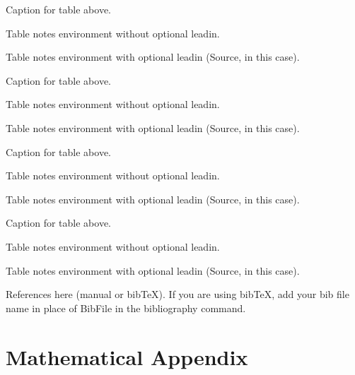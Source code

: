 \documentclass[AER]{AEA}
\begin{document}
\begin{table}
\caption{Caption for table above.}



\begin{tablenotes}
Table notes environment without optional leadin.
\end{tablenotes}
\begin{tablenotes}[Source]
Table notes environment with optional leadin (Source, in this case).
\end{tablenotes}
\end{table}

\begin{table}
\caption{Caption for table above.}



\begin{tablenotes}
Table notes environment without optional leadin.
\end{tablenotes}
\begin{tablenotes}[Source]
Table notes environment with optional leadin (Source, in this case).
\end{tablenotes}
\end{table}

\begin{table}
\caption{Caption for table above.}



\begin{tablenotes}
Table notes environment without optional leadin.
\end{tablenotes}
\begin{tablenotes}[Source]
Table notes environment with optional leadin (Source, in this case).
\end{tablenotes}
\end{table}

\begin{table}
\caption{Caption for table above.}



\begin{tablenotes}
Table notes environment without optional leadin.
\end{tablenotes}
\begin{tablenotes}[Source]
Table notes environment with optional leadin (Source, in this case).
\end{tablenotes}
\end{table}


References here (manual or bibTeX). If you are using bibTeX, add your bib file 
name in place of BibFile in the bibliography command.



\appendix

\section{Mathematical Appendix}
\end{document}
